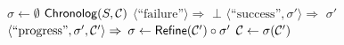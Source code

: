\documentclass[pdflatex,sn-mathphys-num]{sn-jnl}%
\theoremstyle{thmstyleone}%
\theoremstyle{thmstyletwo}%
\theoremstyle{thmstylethree}%
\begin{document}


\begin{algorithm}[tb]
  \caption{Constraint solving with Chronolog.}
  \label{alg:solver}
  \begin{algorithmic}[1]
    \State $\sigma \gets \emptyset$ %
    \While{$\constraints \neq \emptyset$}
    \State \Match $\textsf{Chronolog}(S, \mathcal{C})$ \With
    \State \quad \Case $\langle \text{``failure''} \rangle \Rightarrow$ \Return $\bot$
    \State \quad \Case $\langle \text{``success''}, \sigma' \rangle \Rightarrow$
    \Return $\sigma'$
    \State \quad \Case $\langle \text{``progress''}, \sigma', \mathcal{C}' \rangle \Rightarrow$
    \State \qquad $\sigma \gets \textsf{Refine}(\mathcal{C}') \circ \sigma'$
    \State \qquad $\mathcal{C} \gets \sigma(\mathcal{C}')$
    \State \EndMatch
    \EndWhile
    \EndFunction
  \end{algorithmic}
\end{algorithm}
\end{document}
